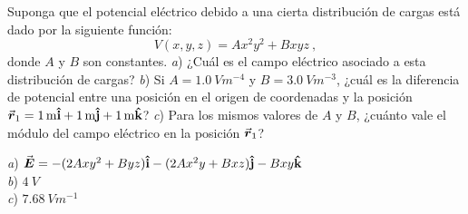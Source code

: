 %
\begin{Exercise}
  Suponga que el potencial eléctrico debido a una cierta distribución de cargas está dado por la siguiente función: \[V(x,y,z) = Ax^2y^2 + Bxyz~,\] donde $A$ y $B$ son constantes. \textit{a}) ¿Cuál es el campo eléctrico asociado a esta distribución de cargas? \textit{b}) Si $A = \SI{1.0}{Vm^{-4}}$ y $B = \SI{3.0}{Vm^{-3}}$, ¿cuál es la diferencia de potencial entre una posición en el origen de coordenadas y la posición $\va*{r}_1 =\SI{1}{\metre}\vu{i} + \SI{1}{\metre}\vu{j} + \SI{1}{\metre}\vu{k}$? \textit{c}) Para los mismos valores de $A$ y $B$,  ¿cuánto vale el módulo del campo eléctrico en la posición $\va*{r}_1$?
\end{Exercise}
\begin{Answer}
  \begin{minipage}[t]{.4\textwidth}
    \textit{a}) $\va*{E} = -(2Axy^2+Byz)\vu{i} -(2Ax^2y+Bxz)\vu{j}-Bxy\vu{k}$\\
    \textit{b}) $\SI{4}{V}$\\
    \textit{c}) $\SI{7.68}{Vm^{-1}}$
  \end{minipage}
\end{Answer}
%
